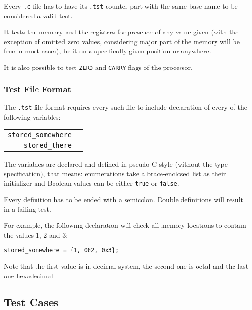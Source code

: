         Every \texttt{.c} file has to have its \texttt{.tst} counter-part with the same base name to be considered a valid test.

        It tests the memory and the registers for presence of any value given (with the exception of omitted zero values, considering major part of the memory will be free in most cases), be it on a specifically given position or anywhere.

        It is also possible to test \texttt{ZERO} and \texttt{CARRY} flags of the processor.

            \subsubsection{Test File Format}

            The \texttt{.tst} file format requires every such file to include declaration of every of the following variables:

            \begin{center}
            \begin{tabular}{ r | l }
                \texttt{stored\_somewhere} & \todo{...}\\

                \texttt{stored\_there} & \todo{...}\\

            \end{tabular}
            \end{center}

            The variables are declared and defined in pseudo-C style (without the type specification), that means: enumerations take a brace-enclosed list as their initializer and Boolean values can be either \texttt{true} or \texttt{false}.

            Every definition has to be ended with a semicolon. Double definitions will result in a failing test.

            For example, the following declaration will check all memory locations to contain the values 1, 2 and 3:

            \begin{center}
                \texttt{stored\_somewhere = \{1, 002, 0x3\};}
            \end{center}

            Note that the first value is in decimal system, the second one is octal and the last one hexadecimal.

        \subsection{Test Cases}

